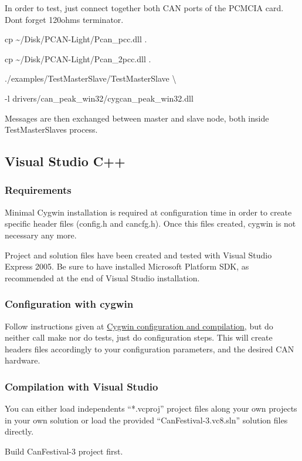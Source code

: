 \documentclass[a4paper,12pt]{book}
\begin{document}
In order to test, just connect together both CAN ports of the PCMCIA
card. Don{\textquotesingle}t forget 120ohms terminator.

{\ttfamily
cp \~{}/Disk/PCAN{}-Light/Pcan\_pcc.dll .}

{\ttfamily
cp \~{}/Disk/PCAN{}-Light/Pcan\_2pcc.dll .}

{\ttfamily
./examples/TestMasterSlave/TestMasterSlave {\textbackslash}}

{\ttfamily
  {}-l drivers/can\_peak\_win32/cygcan\_peak\_win32.dll}

Messages are then exchanged between master and slave node, both inside
TestMasterSlave{\textquotesingle}s process.

\subsection{Visual Studio C++}
\subsubsection{Requirements}
Minimal Cygwin installation is required at configuration time in order
to create specific header files (config.h and cancfg.h). Once this
files created, cygwin is not necessary any more.

Project and solution files have been created and tested with Visual
Studio Express 2005. Be sure to have installed Microsoft Platform SDK,
as recommended at the end of Visual Studio installation.

\subsubsection{Configuration with cygwin}
Follow instructions given at 
\hyperlink{Cygwin configuration and compilation}{Cygwin
configuration and compilation}, but do neither call make nor do tests,
just do configuration steps. This will create headers files accordingly
to your configuration parameters, and the desired CAN hardware.

\subsubsection{Compilation with Visual Studio}
You can either load independents ``*.vcproj'' project files along your
own projects in your own solution or load the provided
``CanFestival{}-3.vc8.sln'' solution files directly.

Build CanFestival{}-3 project first.
\end{document}

